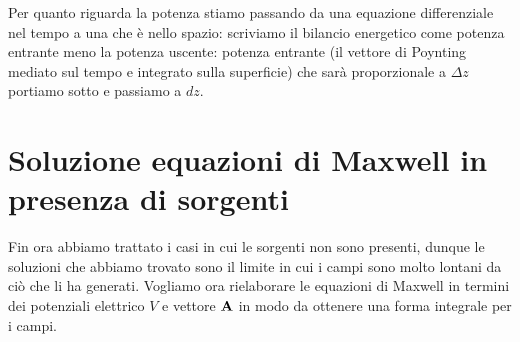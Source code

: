 {Per quanto riguarda la potenza stiamo passando da una equazione differenziale nel tempo a una che è nello spazio: 
scriviamo il bilancio energetico come potenza entrante meno la potenza uscente: potenza entrante (il vettore di 
Poynting mediato sul tempo e integrato sulla superficie) che sarà proporzionale a $ \Delta z $ portiamo sotto e 
passiamo a $ dz $.}


\section{Soluzione equazioni di Maxwell in presenza di sorgenti} \label{section:_soluzione_Maxwell_con_sorgenti}
Fin ora abbiamo trattato i casi in cui le sorgenti non sono presenti, dunque le soluzioni che abbiamo trovato sono il limite in cui i campi sono molto 
lontani da ciò che li ha generati. Vogliamo ora rielaborare le equazioni di Maxwell in termini dei potenziali elettrico $ V $ e vettore $ \mathbf{ A } $ 
in modo da ottenere una forma integrale per i campi.

